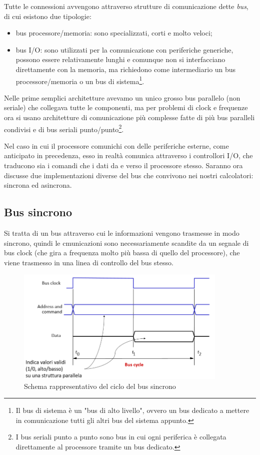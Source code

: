 \documentclass[class=book, crop=false, oneside]{standalone}
\begin{document}
Tutte le connessioni avvengono attraverso strutture di comunicazione dette \emph{bus}, di cui esistono due tipologie:
\begin{itemize}
	\item bus processore/memoria: sono specializzati, corti e molto veloci;
	\item bus I/O: sono utilizzati per la comunicazione con periferiche generiche, possono essere relativamente lunghi e comunque non si interfacciano direttamente con la memoria, ma richiedono come intermediario un bus processore/memoria o un bus di sistema\footnote{Il bus di sistema è un "bus di alto livello", ovvero un bus dedicato a  mettere in comunicazione tutti gli altri bus del sistema appunto.}.
\end{itemize}
Nelle prime semplici architetture avevamo un unico grosso bus parallelo (non seriale) che collegava tutte le componenti, ma per problemi di clock e frequenze ora si usano architetture di comunicazione più complesse fatte di più bus paralleli condivisi e di bus seriali punto/punto\footnote{I bus seriali punto a punto sono bus in cui ogni periferica è collegata direttamente al processore tramite un bus dedicato.}.

Nel caso in cui il processore comunichi con delle periferiche esterne, come anticipato in precedenza, esso in realtà comunica attraverso i controllori I/O, che traducono sia i comandi che i dati da e verso il processore stesso.
Saranno ora discusse due implementazioni diverse del bus che convivono nei nostri calcolatori: sincrona ed asincrona.

\subsection{Bus sincrono}
Si tratta di un bus attraverso cui le informazioni vengono trasmesse in modo sincrono, quindi le cmunicazioni sono necessariamente scandite da un segnale di bus clock (che gira a frequenza molto più bassa di quello del processore), che viene trasmesso in una linea di controllo del bus stesso.

\begin{figure}[H]
	\centering
	\includegraphics[width=0.9\textwidth,keepaspectratio]{bus-sincrono}
	\caption{Schema rappresentativo del ciclo del bus sincrono}
\end{figure}
\end{document}
